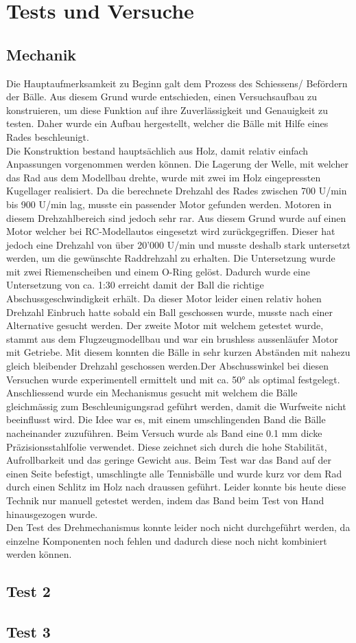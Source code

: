 \section{Tests und Versuche}

\subsection{Mechanik}


Die Hauptaufmerksamkeit zu Beginn galt dem Prozess des Schiessens/ Befördern der Bälle. Aus diesem Grund wurde entschieden, einen Versuchsaufbau zu konstruieren, um diese Funktion auf ihre Zuverlässigkeit und Genauigkeit zu testen. Daher wurde ein Aufbau hergestellt, welcher die Bälle mit Hilfe eines Rades beschleunigt.
%
%
\\Die Konstruktion bestand hauptsächlich aus Holz, damit relativ einfach Anpassungen vorgenommen werden können. Die Lagerung der Welle, mit welcher das Rad aus dem Modellbau drehte, wurde mit zwei im Holz eingepressten Kugellager realisiert. Da die berechnete Drehzahl des Rades zwischen 700 U/min bis 900 U/min lag, musste ein passender Motor gefunden werden. Motoren in diesem Drehzahlbereich sind jedoch sehr rar. Aus diesem Grund wurde auf einen Motor welcher bei RC-Modellautos eingesetzt wird zurückgegriffen. Dieser hat jedoch eine Drehzahl von über 20'000 U/min und musste deshalb stark untersetzt werden, um die gewünschte Raddrehzahl zu erhalten. Die Untersetzung wurde mit zwei Riemenscheiben und einem O-Ring gelöst. Dadurch wurde eine Untersetzung von ca. 1:30 erreicht damit der Ball die richtige Abschussgeschwindigkeit erhält. Da dieser Motor leider einen relativ hohen Drehzahl Einbruch hatte sobald ein Ball geschossen wurde, musste nach einer Alternative gesucht werden. Der zweite Motor mit welchem getestet wurde, stammt aus dem Flugzeugmodellbau und war ein brushless aussenläufer Motor mit Getriebe. Mit diesem konnten die Bälle in sehr kurzen Abständen mit nahezu gleich bleibender Drehzahl geschossen werden.Der Abschusswinkel bei diesen Versuchen wurde experimentell ermittelt und mit ca. 50° als optimal festgelegt. 
%
%
\\Anschliessend wurde ein Mechanismus gesucht mit welchem die Bälle gleichmässig zum Beschleunigungsrad geführt werden, damit die Wurfweite nicht beeinflusst wird. Die Idee war es, mit einem umschlingenden Band die Bälle nacheinander zuzuführen. Beim Versuch wurde als Band eine 0.1 mm dicke Präzisionsstahlfolie verwendet. Diese zeichnet sich durch die hohe Stabilität, Aufrollbarkeit und das geringe Gewicht aus. Beim Test war das Band auf der einen Seite befestigt, umschlingte alle Tennisbälle und wurde kurz vor dem Rad durch einen Schlitz im Holz nach draussen geführt. Leider konnte bis heute diese Technik nur manuell getestet werden, indem das Band beim Test von Hand hinausgezogen wurde.\\
%
Den Test des Drehmechanismus konnte leider noch nicht durchgeführt werden, da einzelne Komponenten noch fehlen und dadurch diese noch nicht kombiniert werden können.




\subsection{Test 2}

\subsection{Test 3}